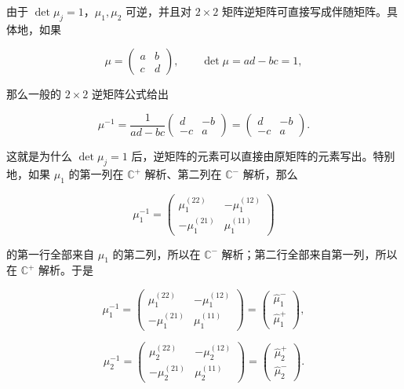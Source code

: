 \documentclass[
    lang=cn,
    scheme=chinese,
    mode=simple,
    device=normal,
    color=blue,
    math=cm,
    thmcnt=section,
    12pt
]{elegantbook}
\begin{document}
由于 $\det\mu_j=1$，$\mu_1,\mu_2$ 可逆，并且对 $2\times2$ 矩阵逆矩阵可直接写成伴随矩阵。具体地，如果

\[
    \mu=
    \begin{pmatrix}
        a & b \\
        c & d
    \end{pmatrix},
    \qquad
    \det\mu=ad-bc=1,
\]

那么一般的 $2\times2$ 逆矩阵公式给出

\[
    \mu^{-1}
    =
    \dfrac{1}{ad-bc}
    \begin{pmatrix}
        d  & -b \\
        -c & a
    \end{pmatrix}
    =
    \begin{pmatrix}
        d  & -b \\
        -c & a
    \end{pmatrix}.
\]

这就是为什么 $\det\mu_j=1$ 后，逆矩阵的元素可以直接由原矩阵的元素写出。特别地，如果 $\mu_1$ 的第一列在 $\mathbb{C}^+$ 解析、第二列在 $\mathbb{C}^-$ 解析，那么

\[
    \mu_1^{-1}
    =
    \begin{pmatrix}
        \mu_1^{(22)}  & -\mu_1^{(12)} \\
        -\mu_1^{(21)} & \mu_1^{(11)}
    \end{pmatrix}
\]

的第一行全部来自 $\mu_1$ 的第二列，所以在 $\mathbb{C}^-$ 解析；第二行全部来自第一列，所以在 $\mathbb{C}^+$ 解析。于是

\begin{equation}
    \mu_1^{-1}
    =
    \begin{pmatrix}
        \mu_1^{(22)}  & -\mu_1^{(12)} \\
        -\mu_1^{(21)} & \mu_1^{(11)}
    \end{pmatrix}
    =
    \begin{pmatrix}
        \widehat\mu_1^- \\
        \widehat\mu_1^+
    \end{pmatrix},
    \tag{5.2.22}
    \label{eq:5.2.22}
\end{equation}

\begin{equation}
    \mu_2^{-1}
    =
    \begin{pmatrix}
        \mu_2^{(22)}  & -\mu_2^{(12)} \\
        -\mu_2^{(21)} & \mu_2^{(11)}
    \end{pmatrix}
    =
    \begin{pmatrix}
        \widehat\mu_2^+ \\
        \widehat\mu_2^-
    \end{pmatrix}.
    \tag{5.2.23}
    \label{eq:5.2.23}
\end{equation}
\end{document}
